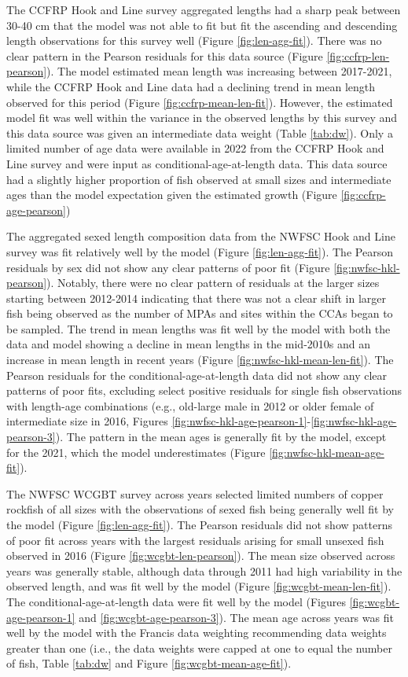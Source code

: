 \documentclass[11pt,
  english,
  letterpaper,
]{article}
\begin{document}
The CCFRP Hook and Line survey aggregated lengths had a sharp peak between 30-40 cm that the model was not able to fit but fit the ascending and descending length observations for this survey well (Figure \ref{fig:len-agg-fit}). There was no clear pattern in the Pearson residuals for this data source (Figure \ref{fig:ccfrp-len-pearson}). The model estimated mean length was increasing between 2017-2021, while the CCFRP Hook and Line data had a declining trend in mean length observed for this period (Figure \ref{fig:ccfrp-mean-len-fit}). However, the estimated model fit was well within the variance in the observed lengths by this survey and this data source was given an intermediate data weight (Table \ref{tab:dw}). Only a limited number of age data were available in 2022 from the CCFRP Hook and Line survey and were input as conditional-age-at-length data. This data source had a slightly higher proportion of fish observed at small sizes and intermediate ages than the model expectation given the estimated growth (Figure \ref{fig:ccfrp-age-pearson})

The aggregated sexed length composition data from the NWFSC Hook and Line survey was fit relatively well by the model (Figure \ref{fig:len-agg-fit}). The Pearson residuals by sex did not show any clear patterns of poor fit (Figure \ref{fig:nwfsc-hkl-pearson}). Notably, there were no clear pattern of residuals at the larger sizes starting between 2012-2014 indicating that there was not a clear shift in larger fish being observed as the number of MPAs and sites within the CCAs began to be sampled. The trend in mean lengths was fit well by the model with both the data and model showing a decline in mean lengths in the mid-2010s and an increase in mean length in recent years (Figure \ref{fig:nwfsc-hkl-mean-len-fit}). The Pearson residuals for the conditional-age-at-length data did not show any clear patterns of poor fits, excluding select positive residuals for single fish observations with length-age combinations (e.g., old-large male in 2012 or older female of intermediate size in 2016, Figures \ref{fig:nwfsc-hkl-age-pearson-1}-\ref{fig:nwfsc-hkl-age-pearson-3}). The pattern in the mean ages is generally fit by the model, except for the 2021, which the model underestimates (Figure \ref{fig:nwfsc-hkl-mean-age-fit}).

The NWFSC WCGBT survey across years selected limited numbers of copper rockfish of all sizes with the observations of sexed fish being generally well fit by the model (Figure \ref{fig:len-agg-fit}). The Pearson residuals did not show patterns of poor fit across years with the largest residuals arising for small unsexed fish observed in 2016 (Figure \ref{fig:wcgbt-len-pearson}). The mean size observed across years was generally stable, although data through 2011 had high variability in the observed length, and was fit well by the model (Figure \ref{fig:wcgbt-mean-len-fit}). The conditional-age-at-length data were fit well by the model (Figures \ref{fig:wcgbt-age-pearson-1} and \ref{fig:wcgbt-age-pearson-3}). The mean age across years was fit well by the model with the Francis data weighting recommending data weights greater than one (i.e., the data weights were capped at one to equal the number of fish, Table \ref{tab:dw} and Figure \ref{fig:wcgbt-mean-age-fit}).
\end{document}
